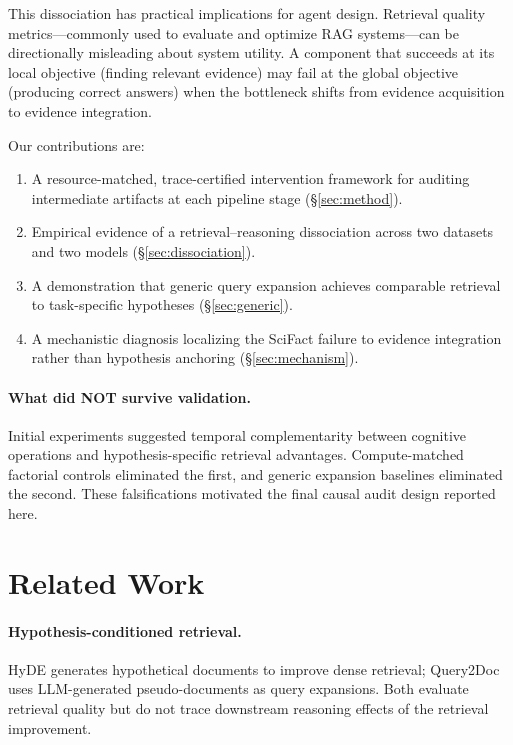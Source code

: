 \documentclass{article}
\begin{document}
This dissociation has practical implications for agent design. Retrieval quality metrics---commonly used to evaluate and optimize RAG systems---can be directionally misleading about system utility. A component that succeeds at its local objective (finding relevant evidence) may fail at the global objective (producing correct answers) when the bottleneck shifts from evidence acquisition to evidence integration.

Our contributions are:
\begin{enumerate}
    \item A resource-matched, trace-certified intervention framework for auditing intermediate artifacts at each pipeline stage (\S\ref{sec:method}).
    \item Empirical evidence of a retrieval--reasoning dissociation across two datasets and two models (\S\ref{sec:dissociation}).
    \item A demonstration that generic query expansion achieves comparable retrieval to task-specific hypotheses (\S\ref{sec:generic}).
    \item A mechanistic diagnosis localizing the SciFact failure to evidence integration rather than hypothesis anchoring (\S\ref{sec:mechanism}).
\end{enumerate}

\paragraph{What did NOT survive validation.}
Initial experiments suggested temporal complementarity between cognitive operations and hypothesis-specific retrieval advantages. Compute-matched factorial controls eliminated the first, and generic expansion baselines eliminated the second. These falsifications motivated the final causal audit design reported here.

\section{Related Work}
\label{sec:related}

\paragraph{Hypothesis-conditioned retrieval.}
HyDE \citep{hyde2023} generates hypothetical documents to improve dense retrieval; Query2Doc \citep{query2doc2023} uses LLM-generated pseudo-documents as query expansions. Both evaluate retrieval quality but do not trace downstream reasoning effects of the retrieval improvement.
\end{document}
